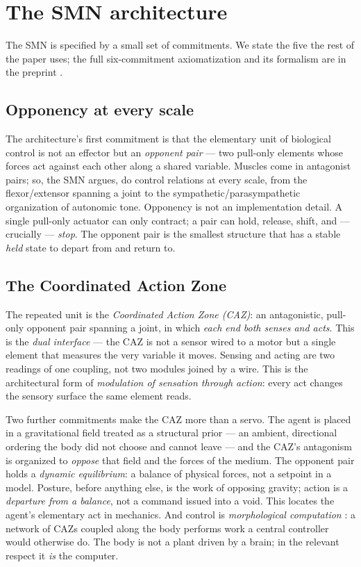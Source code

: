 \documentclass[utf8]{FrontiersinHarvard} %
\begin{document}
\section{The SMN architecture}\label{sec:arch}

The SMN is specified by a small set of commitments. We state the five the rest of the paper uses; the full six-commitment axiomatization and its formalism are in the preprint \citep{NagarjunaKarnam2026SMN}.

\subsection{Opponency at every scale}
The architecture's first commitment is that the elementary unit of biological control is not an effector but an \emph{opponent pair} --- two pull-only elements whose forces act against each other along a shared variable. Muscles come in antagonist pairs; so, the SMN argues, do control relations at every scale, from the flexor/extensor spanning a joint to the sympathetic/parasympathetic organization of autonomic tone. Opponency is not an implementation detail. A single pull-only actuator can only contract; a pair can hold, release, shift, and --- crucially --- \emph{stop}. The opponent pair is the smallest structure that has a stable \emph{held} state to depart from and return to.

\subsection{The Coordinated Action Zone}
The repeated unit is the \emph{Coordinated Action Zone (CAZ)}: an antagonistic, pull-only opponent pair spanning a joint, in which \emph{each end both senses and acts}. This is the \emph{dual interface} --- the CAZ is not a sensor wired to a motor but a single element that measures the very variable it moves. Sensing and acting are two readings of one coupling, not two modules joined by a wire. This is the architectural form of \emph{modulation of sensation through action}: every act changes the sensory surface the same element reads.

Two further commitments make the CAZ more than a servo. The agent is placed in a gravitational field treated as a structural prior --- an ambient, directional ordering the body did not choose and cannot leave --- and the CAZ's antagonism is organized to \emph{oppose} that field and the forces of the medium. The opponent pair holds a \emph{dynamic equilibrium}: a balance of physical forces, not a setpoint in a model. Posture, before anything else, is the work of opposing gravity; action is a \emph{departure from a balance}, not a command issued into a void. This locates the agent's elementary act in mechanics. And control is \emph{morphological computation} \citep{PfeiferBongard2006}: a network of CAZs coupled along the body performs work a central controller would otherwise do. The body is not a plant driven by a brain; in the relevant respect it \emph{is} the computer.
\end{document}
